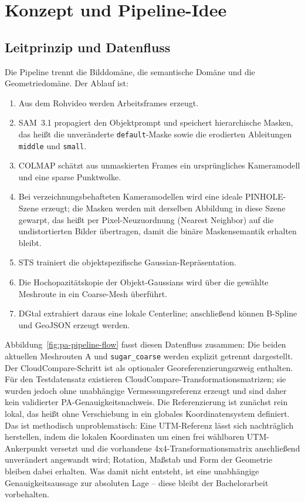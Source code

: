 \section{Konzept und Pipeline-Idee}

\subsection{Leitprinzip und Datenfluss}

Die Pipeline trennt die Bilddomäne, die semantische Domäne und die
Geometriedomäne. Der Ablauf ist:

\begin{enumerate}
  \item Aus dem Rohvideo werden Arbeitsframes erzeugt.
  \item SAM~3.1 propagiert den Objektprompt und speichert hierarchische
        Masken, das heißt die unveränderte \texttt{default}-Maske sowie die
        erodierten Ableitungen \texttt{middle} und \texttt{small}.
  \item COLMAP schätzt aus unmaskierten Frames ein ursprüngliches
        Kameramodell und eine sparse Punktwolke.
  \item Bei verzeichnungsbehafteten Kameramodellen wird eine ideale PINHOLE-
        Szene erzeugt; die Masken werden mit derselben Abbildung in diese
        Szene gewarpt, das heißt per Pixel-Neuzuordnung (Nearest Neighbor)
        auf die undistortierten Bilder übertragen, damit die binäre
        Maskensemantik erhalten bleibt.
  \item STS trainiert die objektspezifische Gaussian-Repräsentation.
  \item Die Hochopazitätskopie der Objekt-Gaussians wird über die gewählte
        Meshroute in ein Coarse-Mesh überführt.
  \item DGtal extrahiert daraus eine lokale Centerline; anschließend können
        B-Spline und GeoJSON erzeugt werden.
\end{enumerate}

Abbildung~\ref{fig:pa-pipeline-flow} fasst diesen Datenfluss zusammen: Die
beiden aktuellen Meshrouten A und \texttt{sugar\_coarse} werden explizit
getrennt dargestellt. Der CloudCompare-Schritt ist als optionaler
Georeferenzierungszweig enthalten. Für den Testdatensatz existieren
CloudCompare-Transformationsmatrizen; sie wurden jedoch ohne unabhängige
Vermessungsreferenz erzeugt und sind daher kein validierter
PA-Genauigkeitsnachweis. Die Referenzierung ist zunächst rein lokal, das
heißt ohne Verschiebung in ein globales Koordinatensystem definiert. Das ist
methodisch unproblematisch: Eine UTM-Referenz lässt sich nachträglich
herstellen, indem die lokalen Koordinaten um einen frei wählbaren
UTM-Ankerpunkt versetzt und die vorhandene 4x4-Transformationsmatrix
anschließend unverändert angewandt wird; Rotation, Maßstab und Form der
Geometrie bleiben dabei erhalten. Was damit nicht entsteht, ist eine
unabhängige Genauigkeitsaussage zur absoluten Lage -- diese bleibt der
Bachelorarbeit vorbehalten.

